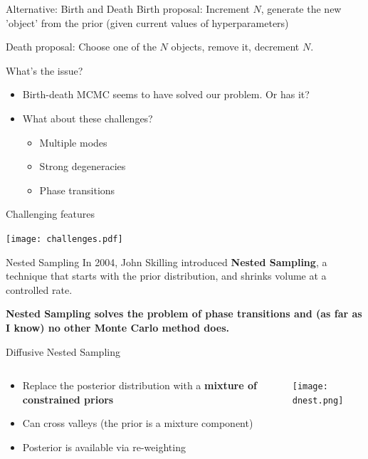 \begin{frame}[t]{Alternative: Birth and Death}
Birth proposal: Increment $N$, generate the new 'object' from the prior
(given current values of hyperparameters)

\vspace{20pt}

Death proposal: Choose one of the $N$ objects, remove it, decrement $N$.
\end{frame}


\begin{frame}[t]{What's the issue?}
\begin{itemize}
\setlength{\itemsep}{20pt}
\item Birth-death MCMC seems to have solved our problem. Or has it?
\item What about these challenges?
\vspace{20pt}
  \begin{itemize}
  \setlength{\itemsep}{20pt}
  \item Multiple modes
  \item Strong degeneracies
  \item Phase transitions
  \end{itemize}
\end{itemize}
\end{frame}

\begin{frame}[t]{Challenging features}
\begin{center}
\texttt{[image: challenges.pdf]}
\end{center}
\end{frame}

\begin{frame}[t]{Nested Sampling}
In 2004, John Skilling introduced {\bf Nested Sampling}, a technique
that starts with the prior distribution, and shrinks volume at a controlled
rate.
\vspace{20pt}

{\bf Nested Sampling solves the problem of phase transitions and (as far as I
know) no other Monte Carlo method does.}
\end{frame}

\begin{frame}[t]{Diffusive Nested Sampling}
\begin{columns}[T]
\begin{column}{0.35\textwidth}
  \vspace{10pt}
  \begin{itemize}
  \setlength{\itemsep}{20pt}
  \item Replace the posterior distribution with a {\bf mixture of constrained priors}
  \item Can cross valleys (the prior is a mixture component)
  \item Posterior is available via re-weighting
  \end{itemize}
\end{column}
\hfill
\begin{column}{0.5\textwidth}
  \hspace{50pt}
  \texttt{[image: dnest.png]}
\end{column}
\end{columns}
\end{frame}

